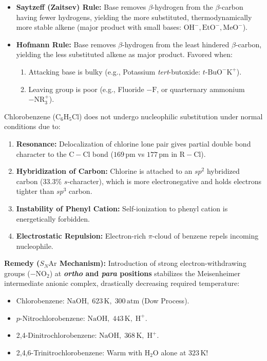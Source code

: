 \documentclass[10pt,twoside,openright]{book}
\begin{document}
\begin{usecasebox}
\begin{itemize}
  \item \textbf{Saytzeff (Zaitsev) Rule:} Base removes $\beta$-hydrogen from the $\beta$-carbon having fewer hydrogens, yielding the more substituted, thermodynamically more stable alkene (major product with small bases: $\mathrm{OH}^-, \mathrm{EtO}^-, \mathrm{MeO}^-$).
  \item \textbf{Hofmann Rule:} Base removes $\beta$-hydrogen from the least hindered $\beta$-carbon, yielding the less substituted alkene as major product. Favored when:
  \begin{enumerate}
    \item Attacking base is bulky (e.g., Potassium \textit{tert}-butoxide: $t\text{-BuO}^-\mathrm{K}^+$).
    \item Leaving group is poor (e.g., Fluoride $-\mathrm{F}$, or quarternary ammonium $-\mathrm{NR}_3^+$).
  \end{enumerate}
\end{itemize}
\end{usecasebox}

\begin{trapbox}
Chlorobenzene ($\mathrm{C_6H_5Cl}$) does not undergo nucleophilic substitution under normal conditions due to:
\begin{enumerate}
  \item \textbf{Resonance:} Delocalization of chlorine lone pair gives partial double bond character to the $\mathrm{C-Cl}$ bond ($169\,\mathrm{pm}$ vs $177\,\mathrm{pm}$ in $\mathrm{R-Cl}$).
  \item \textbf{Hybridization of Carbon:} Chlorine is attached to an $sp^2$ hybridized carbon ($33.3\%$ $s$-character), which is more electronegative and holds electrons tighter than $sp^3$ carbon.
  \item \textbf{Instability of Phenyl Cation:} Self-ionization to phenyl cation is energetically forbidden.
  \item \textbf{Electrostatic Repulsion:} Electron-rich $\pi$-cloud of benzene repels incoming nucleophile.
\end{enumerate}
\textbf{Remedy ($S_N\mathrm{Ar}$ Mechanism):} Introduction of strong electron-withdrawing groups ($-\mathrm{NO}_2$) at \textbf{\textit{ortho} and \textit{para} positions} stabilizes the Meisenheimer intermediate anionic complex, drastically decreasing required temperature:
\begin{itemize}
  \item Chlorobenzene: $\mathrm{NaOH},\; 623\,\mathrm{K},\; 300\,\mathrm{atm}$ (Dow Process).
  \item $p$-Nitrochlorobenzene: $\mathrm{NaOH},\; 443\,\mathrm{K},\; \mathrm{H}^+$.
  \item 2,4-Dinitrochlorobenzene: $\mathrm{NaOH},\; 368\,\mathrm{K},\; \mathrm{H}^+$.
  \item 2,4,6-Trinitrochlorobenzene: Warm with $\mathrm{H_2O}$ alone at $323\,\mathrm{K}$!
\end{itemize}
\end{trapbox}
\end{document}
